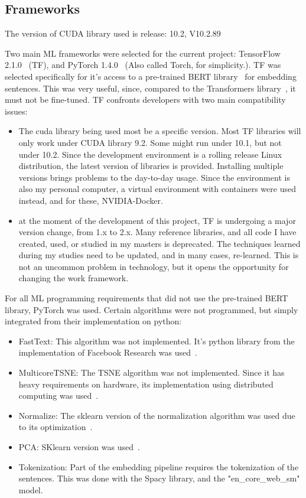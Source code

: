 \subsection{Frameworks}\label{sub:Frameworks}

The version of CUDA library used is release: 10.2, V10.2.89

Two main ML frameworks were selected for the current project: TensorFlow 2.1.0~\cite{tensorflow2015whitepaper} (TF), and PyTorch 1.4.0~\cite{pytorch2019} (Also called Torch, for simplicity.). TF was selected specifically for it's access to a pre-trained BERT library~\cite{lai2015bertembedding} for embedding sentences. This was very useful, since, compared to the Transformers library~\cite{wolf2019huggingface}, it must not be fine-tuned. TF confronts developers with two main compatibility issues:

\begin{itemize}
  \item The cuda library being used most be a specific version. Most TF libraries will only work under CUDA library 9.2. Some might run under 10.1, but not under 10.2. Since the development environment is a rolling release Linux distribution, the latest version of libraries is provided. Installing multiple versions brings problems to the day-to-day usage. Since the environment is also my personal computer, a virtual environment with containers were used instead, and for these, NVIDIA-Docker.

  \item at the moment of the development of this project, TF is undergoing a major version change, from 1.x to 2.x. Many reference libraries, and all code I have created, used, or studied in my masters is deprecated. The techniques learned during my studies need to be updated, and in many cases, re-learned.
  This is not an uncommon problem in technology, but it opens the opportunity for changing the work framework.
\end{itemize}

For all ML programming requirements that did not use the pre-trained BERT library, PyTorch was used. Certain algorithms were not programmed, but simply integrated from their implementation on python:

\begin{itemize}
  \item FastText: This algorithm was not implemented. It's python library from the implementation of Facebook Research was used~\cite{joulin2017fasttext}.
  \item MulticoreTSNE: The TSNE algorithm was not implemented. Since it has heavy requirements on hardware, its implementation using distributed computing was used~\cite{ulyanov2016tsne}.
  \item Normalize: The sklearn version of the normalization algorithm was used due to its optimization~\cite{sklearn}.
  \item PCA: SKlearn version was used~\cite{sklearn}.
  \item Tokenization: Part of the embedding pipeline requires the tokenization of the sentences. This was done with the Spacy library, and the "en_core_web_sm" model.\cite{spacy}
\end{itemize}

